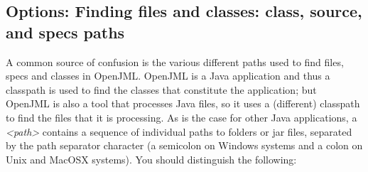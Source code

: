 \documentclass{report}%
\begin{document}
\subsection{Options: Finding files and classes: class, source, and specs paths}

A common source of confusion is the various different paths used to find files, specs and classes in OpenJML.
OpenJML is a Java application and thus a classpath is used to find the classes that constitute the application;
but OpenJML is also a tool that processes Java files, so it uses a (different) classpath to find the files that it is processing. 
As is the case for other Java applications, a {\it <path>} contains a sequence of individual paths to folders or jar files, separated
by the path separator character (a semicolon on Windows systems and a colon on Unix and MacOSX systems).
You should distinguish the following:
\end{document}
